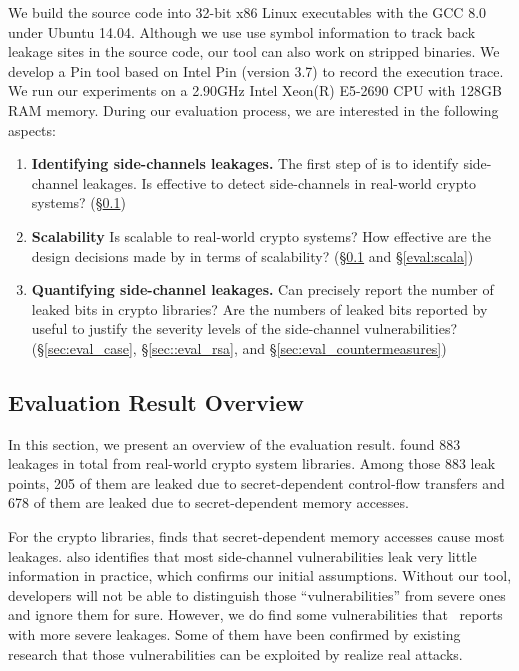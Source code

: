 We build the source code into 32-bit x86 Linux executables with the GCC 8.0
under Ubuntu 14.04. Although we use use symbol information to track back leakage
sites in the source code, our tool can also work on stripped binaries. We
develop a Pin tool based on Intel Pin (version 3.7) to record the execution
trace. We run our experiments on a 2.90GHz Intel Xeon(R) E5-2690 CPU with 128GB
RAM memory. During our evaluation process, we are interested in the following
aspects:
\begin{enumerate}
    \item  \textbf{Identifying side-channels leakages.}
          The first step of \tool{} is to identify side-channel leakages. Is
          \tool{} effective to detect side-channels in real-world crypto
          systems? (\S\ref{sec:eval_overview})
    \item  \textbf{Scalability}
          Is \tool{} scalable to real-world crypto systems? How effective are
          the design decisions made by \tool{} in terms of scalability?
          (\S\ref{sec:eval_overview} and \S\ref{eval:scala})
    \item  \textbf{Quantifying side-channel leakages.}
          Can \tool{} precisely report the number of leaked bits in crypto
          libraries? Are the numbers of leaked bits reported by \tool{} useful
          to justify the severity levels of the side-channel vulnerabilities?
          (\S\ref{sec:eval_case}, \S\ref{sec::eval_rsa}, and \S\ref{sec:eval_countermeasures})
\end{enumerate}

\subsection{Evaluation Result Overview} \label{sec:eval_overview}
In this section, we present an overview of the evaluation result. \tool{} found
883 leakages in total from real-world crypto system libraries. Among those 883
leak points, 205 of them are leaked due to secret-dependent control-flow
transfers and 678 of them are leaked due to secret-dependent memory accesses.

For the crypto libraries, \tool{} finds that secret-dependent memory accesses
cause most leakages. \tool{} also identifies that most side-channel
vulnerabilities leak very little information in practice, which confirms our
initial assumptions.  Without our tool, developers will not be able to
distinguish those ``vulnerabilities'' from severe ones and ignore them for sure.
However, we do find some vulnerabilities that \tool\ reports with more severe
leakages. Some of them have been confirmed by existing research that those
vulnerabilities can be exploited by realize real attacks.

